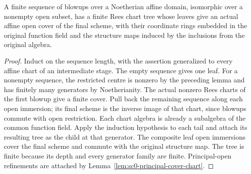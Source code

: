 \begin{theorem}\label{thm:sc0-recursive-rees-transport}
\notready
{}
A finite sequence of blowups over a Noetherian affine domain, isomorphic over a nonempty open
subset, has a finite Rees chart tree whose leaves give an actual affine open cover of the final
scheme, with their coordinate rings embedded in the original function field and the structure
maps induced by the inclusions from the original algebra.
\end{theorem}
\begin{proof}
Induct on the sequence length, with the assertion generalized to every affine chart of an
intermediate stage. The empty sequence gives one leaf. For a nonempty sequence, the restricted
centre is nonzero by the preceding lemma and has finitely many generators by Noetherianity.
The actual nonzero Rees charts of the first blowup give a finite cover. Pull back the remaining
sequence along each open immersion; its final scheme is the inverse image of that chart, since
blowups commute with open restriction. Each chart algebra is already a subalgebra of the common
function field. Apply the induction hypothesis to each tail and attach its resulting tree as
the child at that generator. The composite leaf open immersions cover the final scheme and
commute with the original structure map. The tree is finite because its depth and every
generator family are finite. Principal-open refinements are attached by
Lemma~\ref{lem:sc0-principal-cover-chart}.
\end{proof}

